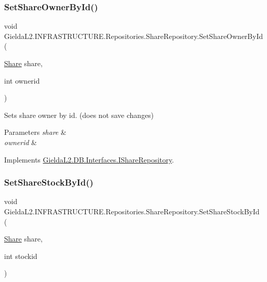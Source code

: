 \subsubsection{\texorpdfstring{SetShareOwnerById()}{SetShareOwnerById()}}
{\footnotesize\ttfamily void Gielda\+L2.\+I\+N\+F\+R\+A\+S\+T\+R\+U\+C\+T\+U\+R\+E.\+Repositories.\+Share\+Repository.\+Set\+Share\+Owner\+By\+Id (\begin{DoxyParamCaption}\item[{\mbox{\hyperlink{class_gielda_l2_1_1_d_b_1_1_entities_1_1_share}{Share}}}]{share,  }\item[{int}]{ownerid }\end{DoxyParamCaption})}



Sets share owner by id. (does not save changes) 


\begin{DoxyParams}{Parameters}
{\em share} & \\
\hline
{\em ownerid} & \\
\hline
\end{DoxyParams}


Implements \mbox{\hyperlink{interface_gielda_l2_1_1_d_b_1_1_interfaces_1_1_i_share_repository_a9670fbeb44bb7ac102fdff4b6a38e24f}{Gielda\+L2.\+D\+B.\+Interfaces.\+I\+Share\+Repository}}.

\mbox{\label{class_gielda_l2_1_1_i_n_f_r_a_s_t_r_u_c_t_u_r_e_1_1_repositories_1_1_share_repository_a9ab77adf00ff67d057e01c6fa2c8278c}} 
\subsubsection{\texorpdfstring{SetShareStockById()}{SetShareStockById()}}
{\footnotesize\ttfamily void Gielda\+L2.\+I\+N\+F\+R\+A\+S\+T\+R\+U\+C\+T\+U\+R\+E.\+Repositories.\+Share\+Repository.\+Set\+Share\+Stock\+By\+Id (\begin{DoxyParamCaption}\item[{\mbox{\hyperlink{class_gielda_l2_1_1_d_b_1_1_entities_1_1_share}{Share}}}]{share,  }\item[{int}]{stockid }\end{DoxyParamCaption})}



